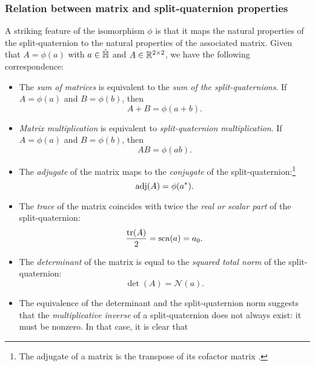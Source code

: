 \subsubsection{Relation between matrix and split-quaternion properties} 
A striking feature of the isomorphism \(\phi\) is that it maps the natural properties of the split-quaternion to the natural properties of the associated matrix. Given that \(A = \phi(a)\) with \(a \in \hat{\mathbb{H}}\) and \(A \in \mathbb{R}^{2\times2}\), we have the following correspondence: 
\begin{itemize}
    \item The \emph{sum of matrices} is equivalent to the \emph{sum of the split-quaternions}. If \(A = \phi(a)\) and \(B = \phi(b)\), then
        \begin{equation}
            A + B = \phi(a + b).
        \end{equation}
    \item \emph{Matrix multiplication} is equivalent to \emph{split-quaternion multiplication}. If \(A = \phi(a)\) and \(B = \phi(b)\), then
        \begin{equation}
              AB = \phi(ab).
        \end{equation}
    \item The \emph{adjugate} of the matrix maps to the \emph{conjugate} of the split-quaternion:\footnote
        {The adjugate of a matrix is the transpose of its cofactor matrix \cite{Verhaegen2007}.}
        \begin{equation}
             \operatorname{adj}(A) = \phi(a^*).
        \end{equation}
    \item The \emph{trace} of the matrix coincides with twice the \emph{real or scalar part} of the split-quaternion:
        \begin{equation}
             \frac{\trace(A)}{2} = \scapart{a} = a_0.
        \end{equation}
    \item The \emph{determinant} of the matrix is equal to the \emph{squared total norm} of the split-quaternion:
        \begin{equation}
              \det(A) = \mathscr{N}(a).
        \end{equation}
    \item The equivalence of the determinant and the split-quaternion norm suggests that the \emph{multiplicative inverse} of a split-quaternion does not always exist: it must be nonzero. In that case, it is clear that
        \begin{equation}

\end{equation}
\end{itemize}
